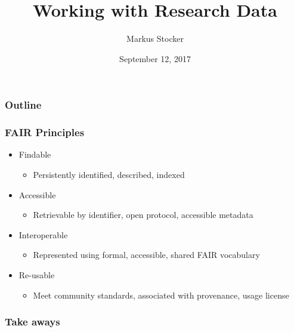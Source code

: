 \documentclass{beamer}
\title{Working with Research Data}
\author{Markus Stocker}
\date{September 12, 2017}
\begin{document}
\maketitle

\begin{frame}
  \frametitle{Outline}
  
\end{frame}

\begin{frame}
  \frametitle{FAIR Principles}
  
  \begin{itemize}
  \item Findable
  \begin{itemize}
  \item Persistently identified, described, indexed
  \end{itemize}
  \item Accessible
  \begin{itemize}
  \item Retrievable by identifier, open protocol, accessible metadata
  \end{itemize}
  \item Interoperable
  \begin{itemize}
  \item Represented using formal, accessible, shared FAIR vocabulary
  \end{itemize}
  \item Re-usable
  \begin{itemize}
  \item Meet community standards, associated with provenance, usage license
  \end{itemize}
  \end{itemize}
\end{frame}

\begin{frame}
  \frametitle{Take aways}
  
\end{frame}
\end{document}
